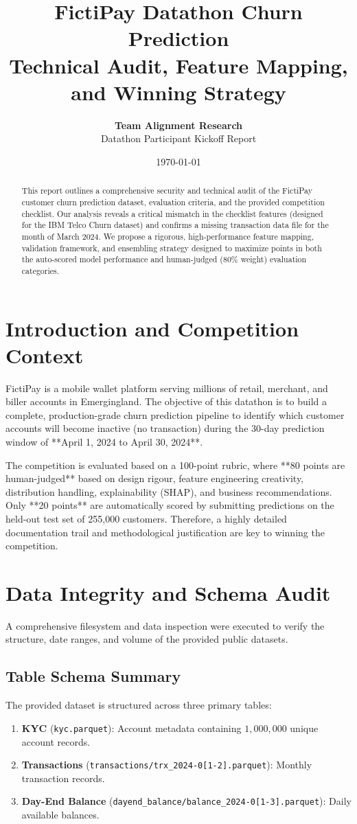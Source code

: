 \documentclass[11pt,a4paper]{article}
\title{\textbf{FictiPay Datathon Churn Prediction} \\ \large Technical Audit, Feature Mapping, and Winning Strategy}
\author{\textbf{Team Alignment Research} \\ Datathon Participant Kickoff Report}
\date{\today}
\begin{document}
\maketitle

\begin{abstract}
This report outlines a comprehensive security and technical audit of the FictiPay customer churn prediction dataset, evaluation criteria, and the provided competition checklist. Our analysis reveals a critical mismatch in the checklist features (designed for the IBM Telco Churn dataset) and confirms a missing transaction data file for the month of March 2024. We propose a rigorous, high-performance feature mapping, validation framework, and ensembling strategy designed to maximize points in both the auto-scored model performance and human-judged (80\% weight) evaluation categories.
\end{abstract}

\tableofcontents
\newpage

\section{Introduction and Competition Context}
FictiPay is a mobile wallet platform serving millions of retail, merchant, and biller accounts in Emergingland. The objective of this datathon is to build a complete, production-grade churn prediction pipeline to identify which customer accounts will become inactive (no transaction) during the 30-day prediction window of **April 1, 2024 to April 30, 2024**.

The competition is evaluated based on a 100-point rubric, where **80 points are human-judged** based on design rigour, feature engineering creativity, distribution handling, explainability (SHAP), and business recommendations. Only **20 points** are automatically scored by submitting predictions on the held-out test set of 255,000 customers. Therefore, a highly detailed documentation trail and methodological justification are key to winning the competition.

\section{Data Integrity and Schema Audit}
A comprehensive filesystem and data inspection were executed to verify the structure, date ranges, and volume of the provided public datasets.

\subsection{Table Schema Summary}
The provided dataset is structured across three primary tables:
\begin{enumerate}
    \item \textbf{KYC} (\texttt{kyc.parquet}): Account metadata containing $1,000,000$ unique account records.
    \item \textbf{Transactions} (\texttt{transactions/trx\_2024-0[1-2].parquet}): Monthly transaction records.
    \item \textbf{Day-End Balance} (\texttt{dayend\_balance/balance\_2024-0[1-3].parquet}): Daily available balances.
\end{enumerate}
\end{document}

